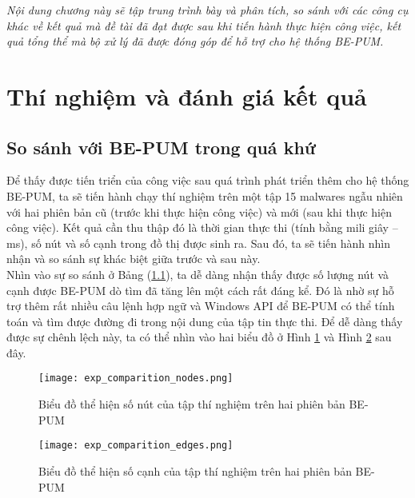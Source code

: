 
\begin{concept}[15cm]
\textit{Nội dung chương này sẽ tập trung trình bày và phân tích, so sánh với các công cụ khác về kết quả mà đề tài đã đạt được sau khi tiến hành thực hiện công việc, kết quả tổng thể mà bộ xử lý đã được đóng góp để hỗ trợ cho hệ thống BE-PUM.}
\end{concept}

\section{Thí nghiệm và đánh giá kết quả}
	\subsection{So sánh với BE-PUM trong quá khứ}
Để thấy được tiến triển của công việc sau quá trình phát triển thêm cho hệ thống BE-PUM, ta sẽ tiến hành chạy thí nghiệm trên một tập 15 malwares ngẫu nhiên với hai phiên bản cũ (trước khi thực hiện công việc) và mới (sau khi thực hiện công việc). Kết quả cần thu thập đó là thời gian thực thi (tính bằng mili giây -- ms), số nút và số cạnh trong đồ thị được sinh ra. Sau đó, ta sẽ tiến hành nhìn nhận và so sánh sự khác biệt giữa trước và sau này.\\

Nhìn vào sự so sánh ở Bảng (\ref{}), ta dễ dàng nhận thấy được số lượng nút và cạnh được BE-PUM dò tìm đã tăng lên một cách rất đáng kể. Đó là nhờ sự hỗ trợ thêm rất nhiều câu lệnh hợp ngữ và Windows API để BE-PUM có thể tính toán và tìm được đường đi trong nội dung của tập tin thực thi. Để dễ dàng thấy được sự chênh lệch này, ta có thể nhìn vào hai biểu đồ ở Hình \ref{fig:exp_comparition_nodes} và Hình \ref{fig:exp_comparition_edges} sau đây.


\begin{figure}[htp]
	\begin{center}
		\texttt{[image: exp\_comparition\_nodes.png]}
	\end{center}
	\caption{Biểu đồ thể hiện số nút của tập thí nghiệm trên hai phiên bản BE-PUM}
	\label{fig:exp_comparition_nodes}
\end{figure}

\begin{figure}[htp]
	\begin{center}
		\texttt{[image: exp\_comparition\_edges.png]}
	\end{center}
	\caption{Biểu đồ thể hiện số cạnh của tập thí nghiệm trên hai phiên bản BE-PUM}
	\label{fig:exp_comparition_edges}
\end{figure}

